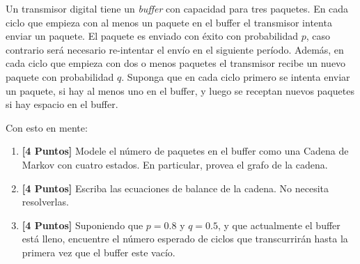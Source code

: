 \documentclass[ a4paper, twoside, 11pt]{article}
\begin{document}
\begin{problem}
Un transmisor digital tiene un \emph{buffer} con capacidad para tres paquetes. \linebreak En cada ciclo que empieza con al menos un paquete en el buffer el transmisor intenta enviar un paquete. El paquete es enviado con \'exito con probabilidad $p$, caso contrario ser\'a necesario re-intentar el env\'io en el siguiente per\'iodo. Adem\'as, en cada ciclo que empieza con dos o menos paquetes el transmisor recibe un nuevo paquete con probabilidad $q$. Suponga que en cada ciclo primero se intenta enviar un paquete, si hay al menos uno en el buffer, y luego se receptan nuevos paquetes si hay espacio en el buffer. 

Con esto en mente: 
\begin{enumerate}[label=\textbf{\alph*)}]
\item \textbf{[4 Puntos]} Modele el n\'umero de paquetes en el buffer como una Cadena de Markov con cuatro estados. En particular, provea el grafo de la cadena. 
\item \textbf{[4 Puntos]} Escriba las ecuaciones de balance de la cadena. No necesita resolverlas. 
\item \textbf{[4 Puntos]} Suponiendo que $p = 0.8$ y $q = 0.5$, y que actualmente el buffer est\'a lleno, encuentre el n\'umero esperado de ciclos que transcurrir\'an hasta la primera vez que el buffer este vac\'io. 
\end{enumerate}
\QED

\end{problem}
\fullskip
\end{document}
